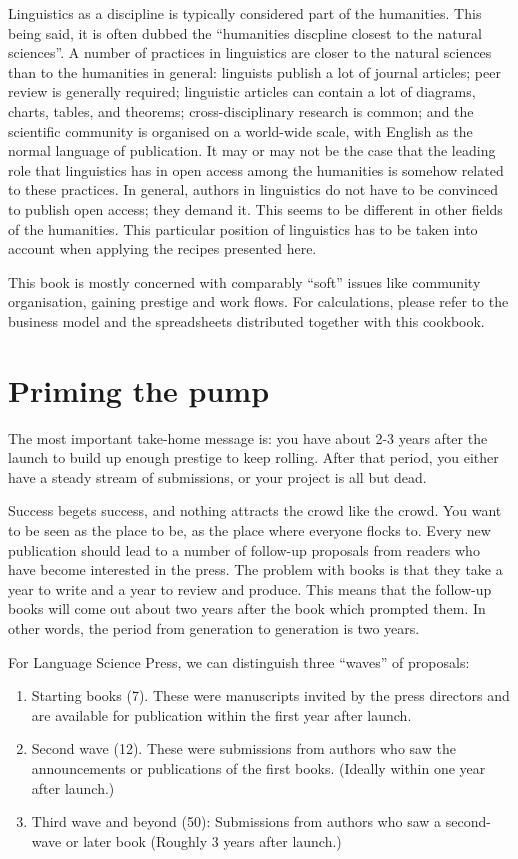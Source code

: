 \documentclass[nonflat,modfonts,output=book] {langsci/langscibook}
\begin{document}
Linguistics as a discipline is typically considered part of the humanities. This being said, it is often dubbed the ``humanities discpline closest to the natural sciences''. A number of practices in linguistics are closer to the natural sciences than to the humanities in general: 
linguists publish a lot of journal articles; 
peer review is generally required; 
linguistic articles can contain a lot of diagrams, charts, tables, and theorems; 
cross-disciplinary research is common; 
and the scientific community is organised on a world-wide scale, with English as the normal language of publication.
It may or may not be the case that the leading role that linguistics has in open access among the humanities is somehow related to these practices. In general, authors in linguistics do not have to be convinced to publish open access; they demand it. This seems to be different in other fields of the humanities. This particular position of linguistics has to be taken into account when applying the recipes presented here. 

This book is mostly concerned with comparably ``soft'' issues like community organisation, gaining prestige and work flows. For calculations, please refer to the business model and the spreadsheets distributed together with this cookbook. 


\chapter{Priming the pump}

The most important take-home message is: you have about 2-3 years after the launch to build up enough prestige to keep rolling. 
After that period, you either have a steady stream of submissions, or your project is all but dead. 

Success begets success, and nothing attracts the crowd like the crowd. You want to be seen as the place to be, as the place where everyone  flocks to. Every new publication should lead to a number of follow-up proposals from readers who have become interested in the press. The problem with books is that they take a year to write and a year to review and produce. This means that the follow-up books will come out about two years after the book which prompted them. In other words, the period from generation to generation is two years. 

For Language Science Press, we can distinguish three ``waves'' of proposals: 

\begin{enumerate}
 \item Starting books (7). These were manuscripts invited by the press directors and are available for publication within the first year after launch.
 \item Second wave (12). These were submissions from authors who saw the announcements or publications of the first books. (Ideally within one  year after launch.)
 \item Third wave and beyond (50): Submissions from authors who saw a second-wave or later book (Roughly 3 years after launch.)
\end{enumerate} 
\end{document}
